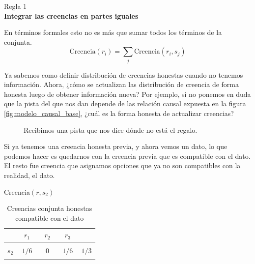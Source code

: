 \documentclass[a4paper,10pt]{book}
\begin{document}
\begin{framed} \centering
Regla 1 \\
\textbf{Integrar las creencias en partes iguales}
\end{framed}

En términos formales esto no es más que sumar todos los términos de la conjunta.
\begin{equation*}
\text{Creencia}(r_i) = \sum_j \text{Creencia}(r_i, s_j) 
\end{equation*}


Ya sabemos como definir distribución de creencias honestas cuando no tenemos información.
Ahora, ¿cómo se actualizan las distribución de creencia de forma honesta luego de obtener información nueva?
Por ejemplo, si no ponemos en duda que la pista del que nos dan depende de las relación causal expuesta en la figura \ref{fig:modelo_causal_base}, ¿cuál es la forma honesta de actualizar creencias?

\begin{figure}[H]
\centering
 \caption{Recibimos una pista que nos dice dónde no está el regalo.}
 \label{fig:pista_no_regalo}
\end{figure}

Si ya tenemos una creencia honesta previa, y ahora vemos un dato, lo que podemos hacer es quedarnos con la creencia previa que es compatible con el dato.
El resto fue creencia que asignamos opciones que ya no son compatibles con la realidad, el dato. 

\begin{table}[H]
\centering
Creencia$(r,s_2)$ \\ \vspace{0.3cm}
 \begin{tabular}{c|c|c|c||c} \setlength\tabcolsep{0.4cm} 
        & \, $r_1$ \, &  \, $r_2$ \, & \, $r_3$ \, &  \phantom{\bm{$1/3$}} \\ \hline 
  &  &  &  & \\ \hline
  $s_2$ & $1/6$ & $0$ & $1/6$ & $1/3$\\ \hline
  &  &  & &  \\ 
\end{tabular}
\caption{Creencias conjunta honestas compatible con el dato}
\label{tab:creencia_condicional_proporcional}
\end{table}
\end{document}
